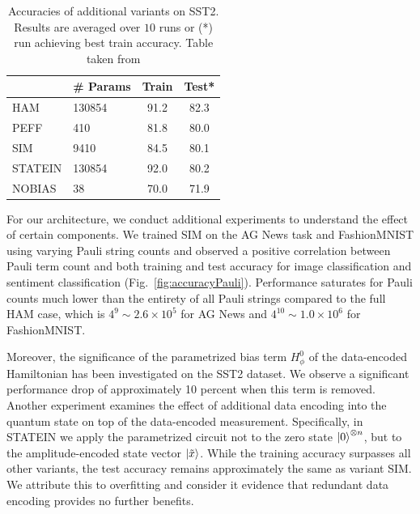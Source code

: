 \documentclass[../main.tex]{subfiles}
\begin{document}
\begin{table}
\centering
\begin{tabular}{llcc}
\toprule
 & \# Params & Train & Test* \\
\midrule
HAM     & 130854    & 91.2 & 82.3 \\
PEFF    & 410       & 81.8 & 80.0 \\
SIM     & 9410      & 84.5 & 80.1 \\
\hline
STATEIN     & 130854    & 92.0 & 80.2 \\
NOBIAS     & 38    & 70.0 & 71.9 \\
\bottomrule
\end{tabular}
\caption{Accuracies of additional variants on SST2. Results are averaged over $10$ runs or (*) run achieving best train accuracy. Table taken from \cite{tiblias2025an}}
\label{tab:abl-sst2}
\end{table}
For our architecture, we conduct additional experiments to understand the effect of certain components. We trained SIM on the AG News task and FashionMNIST using varying Pauli string counts and observed a positive correlation between Pauli term count and both training and test accuracy for image classification and sentiment classification (Fig.~\ref{fig:accuracyPauli}). Performance saturates for Pauli counts much lower than the entirety of all Pauli strings compared to the full HAM case, which is $4^9 \sim 2.6\times 10^5$ for AG News and $4^{10} \sim 1.0\times 10^6$ for FashionMNIST.

Moreover, the significance of the parametrized bias term $H^0_\phi$ of the data-encoded Hamiltonian has been investigated on the SST2 dataset. We observe a significant performance drop of approximately 10 percent when this term is removed. Another experiment examines the effect of additional data encoding into the quantum state on top of the data-encoded measurement. Specifically, in STATEIN we apply the parametrized circuit not to the zero state $\ket{0}^{\otimes n}$, but to the amplitude-encoded state vector $\ket{\tilde{x}}$. While the training accuracy surpasses all other variants, the test accuracy remains approximately the same as variant SIM. We attribute this to overfitting and consider it evidence that redundant data encoding provides no further benefits.
\end{document}
